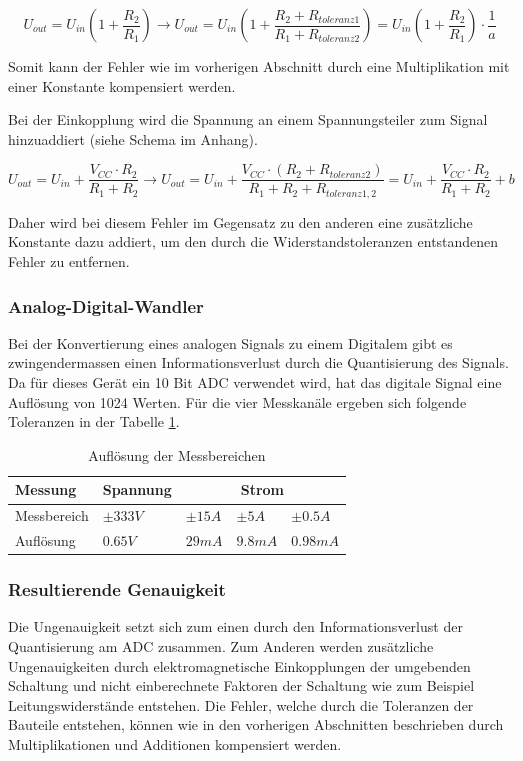 \begin{equation}
U_{out} = U_{in} \left( 1+\frac{R_2}{R_1} \right) \to U_{out} = U_{in} \left( 1+\frac{R_2+R_{toleranz1}}{R_1+R_{toleranz2}} \right) = U_{in}\left(1+\frac{R_2}{R_1}\right) \cdot \frac{1}{a}
\end{equation}

Somit kann der Fehler wie im vorherigen Abschnitt durch eine Multiplikation mit einer Konstante kompensiert werden.

Bei der Einkopplung wird die Spannung an einem Spannungsteiler zum Signal hinzuaddiert (siehe Schema im Anhang).

\begin{equation}
U_{out} = U_{in} + \frac{V_{CC} \cdot R_2}{R_1+R_2} \to U_{out} = U_{in} + \frac{V_{CC} \cdot (R_2 + R_{toleranz2})}{R_1+R_2 + R_{toleranz1,2}} =  U_{in} + \frac{V_{CC} \cdot R_2}{R_1+R_2} + b
\end{equation}

Daher wird bei diesem Fehler im Gegensatz zu den anderen eine zusätzliche Konstante dazu addiert, um den durch die Widerstandstoleranzen entstandenen Fehler zu entfernen.
 
\subsubsection*{Analog-Digital-Wandler}
Bei der Konvertierung eines analogen Signals zu einem Digitalem gibt es zwingendermassen einen Informationsverlust durch die Quantisierung des Signals. Da für dieses Gerät ein 10 Bit ADC verwendet wird, hat das digitale Signal eine Auflösung von 1024 Werten. Für die vier Messkanäle ergeben sich folgende Toleranzen in der Tabelle \ref{tab:auflösung}.


\begin{table}[]
\centering
\begin{tabular}{|l|l|l|l|l|}
\hline
Messung     & Spannung  & \multicolumn{3}{c|}{Strom}     \\ \hline
Messbereich & $\pm333V$ & $\pm15A$ & $\pm5A$ & $\pm0.5A$ \\ \hline
Auflösung   & $0.65V$   & $29mA$   & $9.8mA$ & $0.98mA$  \\ \hline
\end{tabular}
\caption{Auflösung der Messbereichen}
\label{tab:auflösung}
\end{table}

\subsubsection*{Resultierende Genauigkeit} 
Die Ungenauigkeit setzt sich zum einen durch den Informationsverlust der Quantisierung am ADC zusammen. Zum Anderen werden zusätzliche Ungenauigkeiten durch elektromagnetische Einkopplungen der umgebenden Schaltung und nicht einberechnete Faktoren der Schaltung wie zum Beispiel Leitungswiderstände entstehen. Die Fehler, welche durch die Toleranzen der Bauteile entstehen, können wie in den vorherigen Abschnitten beschrieben durch Multiplikationen und Additionen kompensiert werden.



\pagebreak